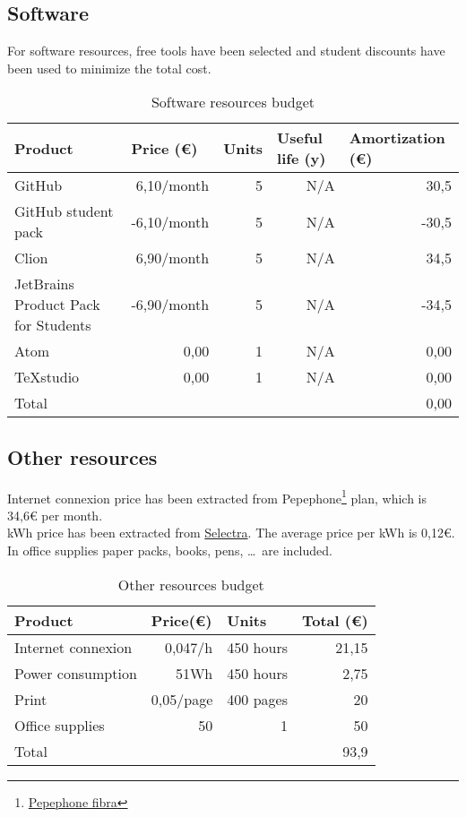 \subsection{Software}
For software resources, free tools have been selected and student discounts have been used to minimize the total cost.
\begin{table}[h!]
	\centering
	\begin{tabular}{|l|r|r|r|r|}
		\hline
		Product              & \multicolumn{1}{l|}{Price (€)} & \multicolumn{1}{l|}{Units} & \multicolumn{1}{l|}{Useful life (y)} & \multicolumn{1}{l|}{Amortization (€)} \\ \hline
		GitHub	& 6,10/month & 5 & N/A & 30,5 \\ \hline
		GitHub student pack & -6,10/month & 5 & N/A & -30,5 \\ \hline
		Clion 	& 6,90/month & 5 & N/A & 34,5 \\ \hline
		JetBrains Product Pack for Students & -6,90/month & 5 & N/A & -34,5 \\ \hline
		Atom 	& 0,00 & 1 & N/A & 0,00 \\ \hline
		TeXstudio 	& 0,00 & 1 & N/A & 0,00 \\ \hline\hline
		Total	& \multicolumn{4}{r|}{0,00}                                                                                           \\ \hline
	\end{tabular}
	\caption{Software resources budget}
	\label{SoftwareResources}
\end{table}

\subsection{Other resources}
Internet connexion price has been extracted from Pepephone\footnote{\href{https://www.pepephone.com/internet-en-casa}{Pepephone fibra}} plan, which is 34,6€ per month. \\
kWh price has been extracted from \href{https://tarifasgasluz.com/faq/precio-kwh-espana-2017}{Selectra}. The average price per kWh is 0,12€.
In office supplies paper packs, books, pens, \ldots \ are included.
\begin{table}[h!]
	\centering
	\begin{tabular}{|l|r|r|r|}
		\hline
		\multicolumn{1}{|l|}{Product} & \multicolumn{1}{l|}{Price(€)} & \multicolumn{1}{l|}{Units} & \multicolumn{1}{l|}{Total (€)} \\ \hline
		Internet connexion & 0,047/h & 450 hours & 21,15\\ \hline
		Power consumption & 51Wh & 450 hours & 2,75 \\ \hline
		Print & 0,05/page & 400 pages & 20 \\ \hline
		Office supplies & 50 & 1 & 50 \\ \hline\hline
		Total & \multicolumn{3}{r|}{93,9}                                                                        \\ \hline
	\end{tabular}
	\caption{Other resources budget}
	\label{OtherResources}
\end{table}

